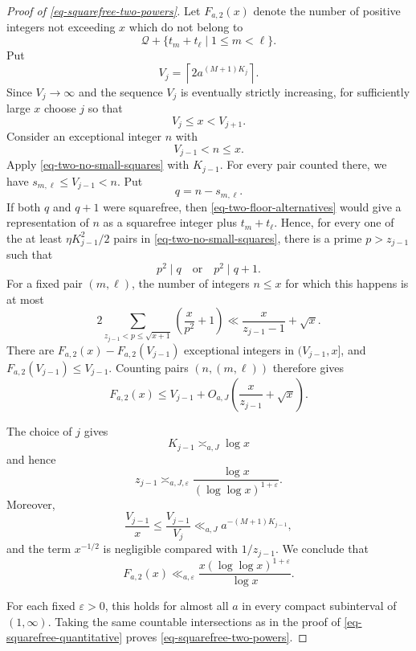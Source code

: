 \documentclass[11pt,reqno]{amsart}
\numberwithin{equation}{section}
\begin{document}
\begin{proof}[Proof of \eqref{eq-squarefree-two-powers}]
        Let $F_{a,2}(x)$ denote the number of positive integers not exceeding $x$ which do not belong to
        $$
        \mathcal{Q}+\{t_m+t_\ell\mid 1\le m<\ell\}.
        $$
        Put
        $$
        V_j=\left\lceil2a^{(M+1)K_j}\right\rceil.
        $$
        Since $V_j\to\infty$ and the sequence $V_j$ is eventually strictly increasing, for sufficiently large $x$ choose $j$ so that
        $$
        V_j\le x<V_{j+1}.
        $$
        Consider an exceptional integer $n$ with
        $$
        V_{j-1}<n\le x.
        $$
        Apply \eqref{eq-two-no-small-squares} with $K_{j-1}$. For every pair counted there, we have $s_{m,\ell}\le V_{j-1}<n$. Put
        $$
        q=n-s_{m,\ell}.
        $$
        If both $q$ and $q+1$ were squarefree, then \eqref{eq-two-floor-alternatives} would give a representation of $n$ as a squarefree integer plus $t_m+t_\ell$. Hence, for every one of the at least $\eta K_{j-1}^2/2$ pairs in \eqref{eq-two-no-small-squares}, there is a prime $p>z_{j-1}$ such that
        $$
        p^2\mid q
        \quad\text{or}\quad
        p^2\mid q+1.
        $$
        For a fixed pair $(m,\ell)$, the number of integers $n\le x$ for which this happens is at most
        $$
        2\sum_{z_{j-1}<p\le\sqrt{x+1}}
        \left(\frac{x}{p^2}+1\right)
        \ll
        \frac{x}{z_{j-1}-1}+\sqrt{x}.
        $$
        There are $F_{a,2}(x)-F_{a,2}(V_{j-1})$ exceptional integers in $(V_{j-1},x]$, and $F_{a,2}(V_{j-1})\le V_{j-1}$. Counting pairs $(n,(m,\ell))$ therefore gives
        $$
        F_{a,2}(x)
        \le
        V_{j-1}
        +O_{a,J}\left(\frac{x}{z_{j-1}}+\sqrt{x}\right).
        $$

        The choice of $j$ gives
        $$
        K_{j-1}\asymp_{a,J}\log x
        $$
        and hence
        $$
        z_{j-1}
        \asymp_{a,J,\varepsilon}
        \frac{\log x}{(\log\log x)^{1+\varepsilon}}.
        $$
        Moreover,
        $$
        \frac{V_{j-1}}x
        \le\frac{V_{j-1}}{V_j}
        \ll_{a,J}a^{-(M+1)K_{j-1}},
        $$
        and the term $x^{-1/2}$ is negligible compared with $1/z_{j-1}$. We conclude that
        $$
        F_{a,2}(x)
        \ll_{a,\varepsilon}
        \frac{x(\log\log x)^{1+\varepsilon}}{\log x}.
        $$

        For each fixed $\varepsilon>0$, this holds for almost all $a$ in every compact subinterval of $(1,\infty)$. Taking the same countable intersections as in the proof of \eqref{eq-squarefree-quantitative} proves \eqref{eq-squarefree-two-powers}.
    \end{proof}
\end{document}
